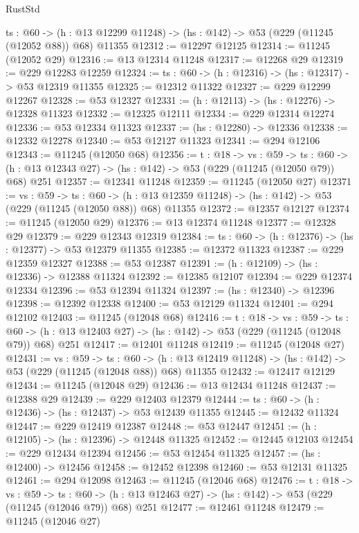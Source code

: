 \begin{lexlean}{RustStd}
\begin{coremodule}
  {ts : @60} ->
  (h : @13 @12299 @11248) -> (hs : @142) -> @53 (@229 (@11245 (@12052 @88)) @68) @11355
@12312 := @12297 @12125
@12314 := @11245 (@12052 @29)
@12316 := @13 @12314 @11248
@12317 := @12268 @29
@12319 := @229 @12283 @12259
@12324 := {ts : @60} -> (h : @12316) -> (hs : @12317) -> @53 @12319 @11355
@12325 := @12312 @11322
@12327 := @229 @12299 @12267
@12328 := @53 @12327
@12331 := (h : @12113) -> (hs : @12276) -> @12328 @11323
@12332 := @12325 @12111
@12334 := @229 @12314 @12274
@12336 := @53 @12334 @11323
@12337 := (hs : @12280) -> @12336
@12338 := @12332 @12278
@12340 := @53 @12127 @11323
@12341 := @294 @12106
@12343 := @11245 (@12050 @68)
@12356 := {t : @18} ->
  {vs : @59} ->
  {ts : @60} -> (h : @13 @12343 @27) -> (hs : @142) -> @53 (@229 (@11245 (@12050 @79)) @68) @251
@12357 := @12341 @11248
@12359 := @11245 (@12050 @27)
@12371 := {vs : @59} ->
  {ts : @60} ->
  (h : @13 @12359 @11248) -> (hs : @142) -> @53 (@229 (@11245 (@12050 @88)) @68) @11355
@12372 := @12357 @12127
@12374 := @11245 (@12050 @29)
@12376 := @13 @12374 @11248
@12377 := @12328 @29
@12379 := @229 @12343 @12319
@12384 := {ts : @60} -> (h : @12376) -> (hs : @12377) -> @53 @12379 @11355
@12385 := @12372 @11323
@12387 := @229 @12359 @12327
@12388 := @53 @12387
@12391 := (h : @12109) -> (hs : @12336) -> @12388 @11324
@12392 := @12385 @12107
@12394 := @229 @12374 @12334
@12396 := @53 @12394 @11324
@12397 := (hs : @12340) -> @12396
@12398 := @12392 @12338
@12400 := @53 @12129 @11324
@12401 := @294 @12102
@12403 := @11245 (@12048 @68)
@12416 := {t : @18} ->
  {vs : @59} ->
  {ts : @60} -> (h : @13 @12403 @27) -> (hs : @142) -> @53 (@229 (@11245 (@12048 @79)) @68) @251
@12417 := @12401 @11248
@12419 := @11245 (@12048 @27)
@12431 := {vs : @59} ->
  {ts : @60} ->
  (h : @13 @12419 @11248) -> (hs : @142) -> @53 (@229 (@11245 (@12048 @88)) @68) @11355
@12432 := @12417 @12129
@12434 := @11245 (@12048 @29)
@12436 := @13 @12434 @11248
@12437 := @12388 @29
@12439 := @229 @12403 @12379
@12444 := {ts : @60} -> (h : @12436) -> (hs : @12437) -> @53 @12439 @11355
@12445 := @12432 @11324
@12447 := @229 @12419 @12387
@12448 := @53 @12447
@12451 := (h : @12105) -> (hs : @12396) -> @12448 @11325
@12452 := @12445 @12103
@12454 := @229 @12434 @12394
@12456 := @53 @12454 @11325
@12457 := (hs : @12400) -> @12456
@12458 := @12452 @12398
@12460 := @53 @12131 @11325
@12461 := @294 @12098
@12463 := @11245 (@12046 @68)
@12476 := {t : @18} ->
  {vs : @59} ->
  {ts : @60} -> (h : @13 @12463 @27) -> (hs : @142) -> @53 (@229 (@11245 (@12046 @79)) @68) @251
@12477 := @12461 @11248
@12479 := @11245 (@12046 @27)

\end{coremodule}
\end{lexlean}
